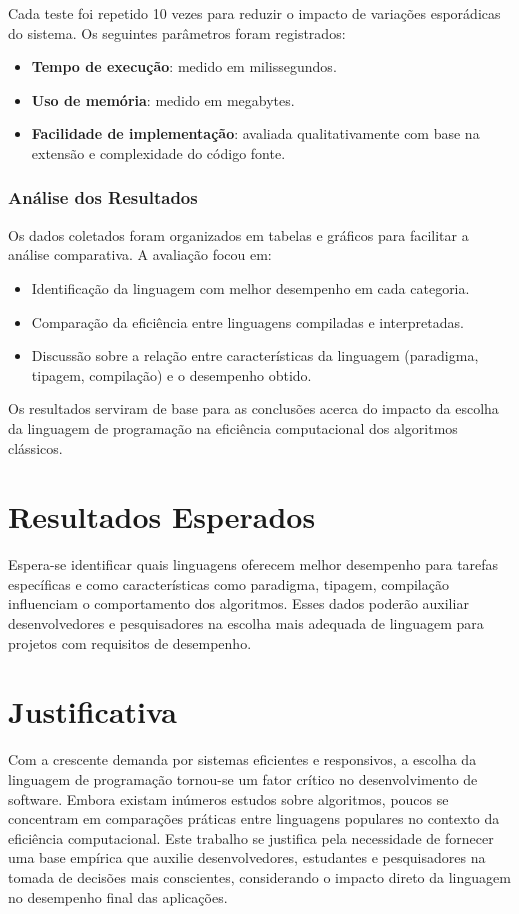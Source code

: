 \documentclass[12pt,oneside,a4paper]{report}
\begin{document}
Cada teste foi repetido 10 vezes para reduzir o impacto de variações esporádicas do sistema. Os seguintes parâmetros foram registrados:

\begin{itemize}
    \item \textbf{Tempo de execução}: medido em milissegundos.
    \item \textbf{Uso de memória}: medido em megabytes.
    \item \textbf{Facilidade de implementação}: avaliada qualitativamente com base na extensão e complexidade do código fonte.
\end{itemize}

\subsection{Análise dos Resultados}

Os dados coletados foram organizados em tabelas e gráficos para facilitar a análise comparativa. A avaliação focou em:

\begin{itemize}
    \item Identificação da linguagem com melhor desempenho em cada categoria.
    \item Comparação da eficiência entre linguagens compiladas e interpretadas.
    \item Discussão sobre a relação entre características da linguagem (paradigma, tipagem, compilação) e o desempenho obtido.
\end{itemize}

Os resultados serviram de base para as conclusões acerca do impacto da escolha da linguagem de programação na eficiência computacional dos algoritmos clássicos.

\chapter{Resultados Esperados}
Espera-se identificar quais linguagens oferecem melhor desempenho para tarefas específicas e como características como paradigma, tipagem, compilação influenciam o comportamento dos algoritmos. Esses dados poderão auxiliar desenvolvedores e pesquisadores na escolha mais adequada de linguagem para projetos com requisitos de desempenho.

\chapter{Justificativa}
Com a crescente demanda por sistemas eficientes e responsivos, a escolha da linguagem de programação tornou-se um fator crítico no desenvolvimento de software. Embora existam inúmeros estudos sobre algoritmos, poucos se concentram em comparações práticas entre linguagens populares no contexto da eficiência computacional. Este trabalho se justifica pela necessidade de fornecer uma base empírica que auxilie desenvolvedores, estudantes e pesquisadores na tomada de decisões mais conscientes, considerando o impacto direto da linguagem no desempenho final das aplicações.





\end{document}
